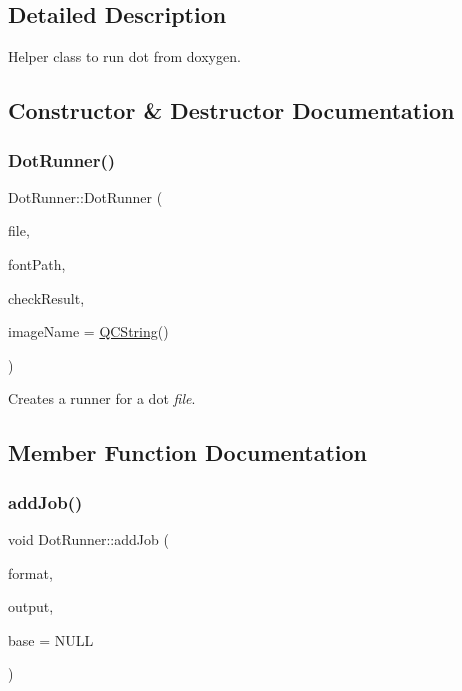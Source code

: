 \subsection{Detailed Description}
Helper class to run dot from doxygen. 

\subsection{Constructor \& Destructor Documentation}
\mbox{\label{class_dot_runner_a0139716432105faf63356af65f993559}} 
\subsubsection{\texorpdfstring{DotRunner()}{DotRunner()}}
{\footnotesize\ttfamily Dot\+Runner\+::\+Dot\+Runner (\begin{DoxyParamCaption}\item[{const \mbox{\hyperlink{class_q_c_string}{Q\+C\+String}} \&}]{file,  }\item[{const \mbox{\hyperlink{class_q_c_string}{Q\+C\+String}} \&}]{font\+Path,  }\item[{bool}]{check\+Result,  }\item[{const \mbox{\hyperlink{class_q_c_string}{Q\+C\+String}} \&}]{image\+Name = {\ttfamily \mbox{\hyperlink{class_q_c_string}{Q\+C\+String}}()} }\end{DoxyParamCaption})}

Creates a runner for a dot {\itshape file}. 

\subsection{Member Function Documentation}
\mbox{\label{class_dot_runner_a52736a54f8ee8d52941cb4b1edaea394}} 
\subsubsection{\texorpdfstring{addJob()}{addJob()}}
{\footnotesize\ttfamily void Dot\+Runner\+::add\+Job (\begin{DoxyParamCaption}\item[{const char $\ast$}]{format,  }\item[{const char $\ast$}]{output,  }\item[{const char $\ast$}]{base = {\ttfamily NULL} }\end{DoxyParamCaption})}

